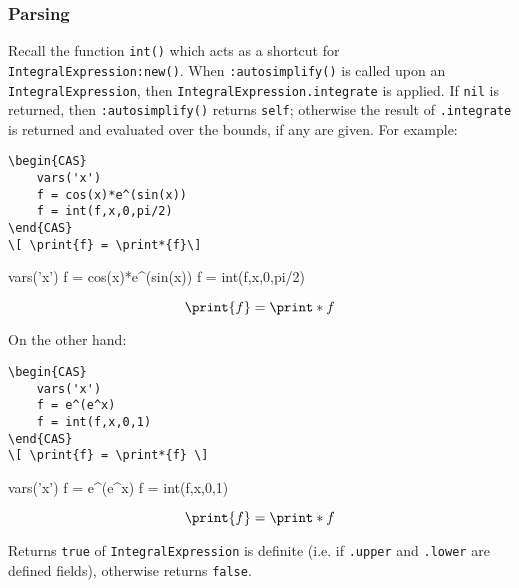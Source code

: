 \subsubsection*{Parsing}

Recall the function \texttt{int()} which acts as a shortcut for \texttt{IntegralExpression:new()}. When \texttt{:autosimplify()} is called upon an \texttt{IntegralExpression}, then \texttt{IntegralExpression.integrate} is applied. If \texttt{nil} is returned, then \texttt{:autosimplify()} returns \texttt{self}; otherwise the result of \texttt{.integrate} is returned and evaluated over the bounds, if any are given. For example:

\begin{codebox}
    \begin{verbatim}
\begin{CAS}
    vars('x')
    f = cos(x)*e^(sin(x))
    f = int(f,x,0,pi/2)
\end{CAS}
\[ \print{f} = \print*{f}\] 
\end{verbatim}
\tcblower
\begin{CAS}
    vars('x')
    f = cos(x)*e^(sin(x))
    f = int(f,x,0,pi/2)
\end{CAS}
\[ \print{f} = \print*{f}\] 
\end{codebox}

On the other hand:
\begin{codebox}
    \begin{verbatim}
\begin{CAS}
    vars('x')
    f = e^(e^x)
    f = int(f,x,0,1)
\end{CAS}
\[ \print{f} = \print*{f} \] 
\end{verbatim}
\tcblower
\begin{CAS}
    vars('x')
    f = e^(e^x)
    f = int(f,x,0,1)
\end{CAS}
\[ \print{f} = \print*{f} \] 
\end{codebox}


Returns \texttt{true} of \texttt{IntegralExpression} is definite (i.e. if \texttt{.upper} and \texttt{.lower} are defined fields), otherwise returns \texttt{false}. 
